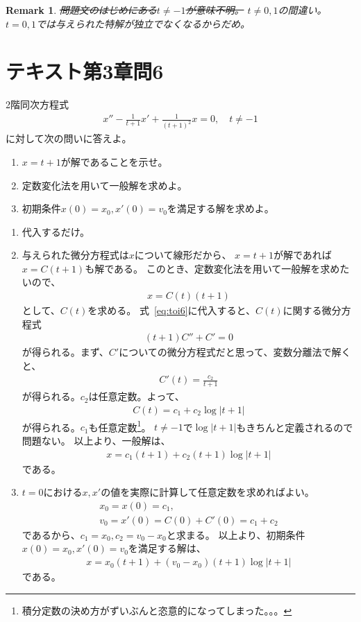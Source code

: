 \documentclass[fleqn]{jsarticle}
\newtheorem{remark}{Remark}
\begin{document}
\begin{remark}
\sout{問題文のはじめにある$t\ne -1$が意味不明。}
$t\ne 0,1$の間違い。$t=0,1$では与えられた特解が独立でなくなるからだめ。
\end{remark}

\section{テキスト第3章問6}
\begin{shaded}
2階同次方程式
\begin{eqnarray}
x''-\frac{1}{t+1}x'+\frac{1}{(t+1)^{2}}x=0,\quad t\ne -1
\label{eq:toi6}
\end{eqnarray}
に対して次の問いに答えよ。
\begin{enumerate}
\item $x=t+1$が解であることを示せ。
\item 定数変化法を用いて一般解を求めよ。
\item 初期条件$x(0)=x_{0},x'(0)=v_{0}$を満足する解を求めよ。
\end{enumerate}
\end{shaded}
\begin{enumerate}
\item 代入するだけ。
\item 与えられた微分方程式は$x$について線形だから、
$x=t+1$が解であれば$x=C(t+1)$も解である。
このとき、定数変化法を用いて一般解を求めたいので、
\begin{eqnarray}
x=C(t)(t+1)
\end{eqnarray}
として、$C(t)$を求める。
式~\eqref{eq:toi6}に代入すると、$C(t)$に関する微分方程式
\begin{eqnarray}
(t+1)C''+C'=0
\end{eqnarray}
が得られる。まず、$C'$についての微分方程式だと思って、変数分離法で解くと、
\begin{eqnarray}
C'(t)=\frac{c_{2}}{t+1}
\end{eqnarray}
が得られる。$c_{2}$は任意定数。よって、
\begin{eqnarray}
C(t)=c_{1}+c_{2}\log |t+1|
\end{eqnarray}
が得られる。$c_{1}$も任意定数\footnote{積分定数の決め方がずいぶんと恣意的になってしまった。。。}。
$t\ne-1$で$\log|t+1|$もきちんと定義されるので問題ない。
以上より、一般解は、
\begin{eqnarray}
x=c_{1}(t+1)+c_{2}(t+1)\log|t+1|
\end{eqnarray}
である。
\item $t=0$における$x,x'$の値を実際に計算して任意定数を求めればよい。
\begin{eqnarray}
x_{0}=x(0)=c_{1},\\
v_{0}=x'(0)=C(0)+C'(0)=c_{1}+c_{2}
\end{eqnarray}
であるから、$c_{1}=x_{0},c_{2}=v_{0}-x_{0}$と求まる。
以上より、初期条件$x(0)=x_{0},x'(0)=v_{0}$を満足する解は、
\begin{eqnarray}
x=x_{0}(t+1)+(v_{0}-x_{0})(t+1)\log|t+1|
\end{eqnarray}
である。
\end{enumerate}
\end{document}
